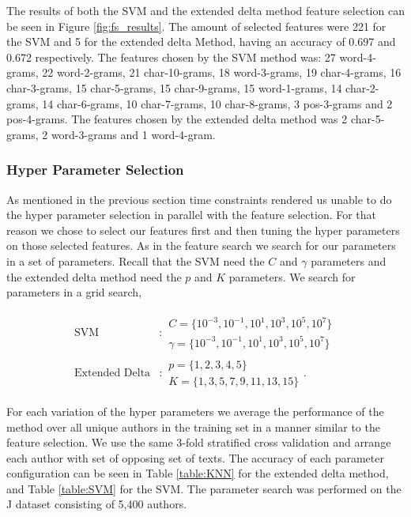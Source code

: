 The results of both the \gls{SVM} and the extended delta method feature
selection can be seen in Figure \ref{fig:fs_results}. The amount of selected
features were 221 for the SVM and 5 for the extended delta Method, having an
accuracy of 0.697 and 0.672 respectively. The features chosen by the \gls{SVM}
method was: 27 word-4-grams, 22 word-2-grams, 21 char-10-grams, 18 word-3-grams,
19 char-4-grams, 16 char-3-grams, 15 char-5-grams, 15 char-9-grams, 15
word-1-grams, 14 char-2-grams, 14 char-6-grams, 10 char-7-grams, 10
char-8-grams, 3 pos-3-grams and 2 pos-4-grams. The features chosen by the
extended delta method was 2 char-5-grams, 2 word-3-grams and 1 word-4-gram.


\subsubsection{Hyper Parameter Selection}\label{sec:hyp_select}

As mentioned in the previous section time constraints rendered us unable to
do the hyper parameter selection in parallel with the feature selection. For
that reason we chose to select our features first and then tuning the hyper
parameters on those selected features. As in the feature search we search for
our parameters in a set of parameters. Recall that the \gls{SVM} need the $C$
and $\gamma$ parameters and the extended delta method need the $p$ and $K$
parameters. We search for parameters in a grid search,

\begin{align}
    \text{SVM} &:
    \begin{array}{lr}
        C=\{10^{-3}, 10^{-1}, 10^{1}, 10^{3}, 10^{5}, 10^7\}\\
        \gamma=\{10^{-3}, 10^{-1}, 10^{1}, 10^{3}, 10^{5}, 10^7\}
    \end{array} \\
    \text{Extended Delta} &:
    \begin{array}{lr}
        p=\{1,2,3,4,5\}\\
        K=\{1,3,5,7,9,11,13,15\}
    \end{array}.
\end{align}

For each variation of the hyper parameters we average the performance of the
method over all unique authors in the training set in a manner similar to the
feature selection. We use the same 3-fold stratified cross validation and
arrange each author with set of opposing set of texts. The accuracy of each
parameter configuration can be seen in Table \ref{table:KNN} for the extended
delta method, and Table \ref{table:SVM} for the \gls{SVM}. The parameter search
was performed on the \gls{J} dataset consisting of 5,400 authors.

